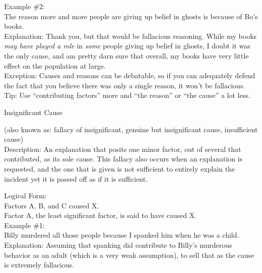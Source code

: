 \documentclass[a4paper,12pt,single,pdftex]{scrartcl}
\begin{document}
{    
      Example \#2:
    \\

    
      The reason more and more people are giving up belief in ghosts is because of Bo’s books.
    \\

    
      Explanation: Thank you, but that would be fallacious reasoning.  While my books {\it may have played a role} in {\it some} people giving up belief in ghosts, I doubt it was the only cause, and am pretty darn sure that overall, my books have very little effect on the population at large.
    \\

    
      Exception: Causes and reasons can be debatable, so if you can adequately defend the fact that you believe there was only a single reason, it won’t be fallacious.
    \\

    
      Tip: Use “contributing factors” more and “the reason” or “the cause” a lot less.
    \\

  }


Insignificant Cause
    
      (also known as: fallacy of insignificant, genuine but insignificant cause, insufficient cause)
    \\

  
    Description: An explanation that posits one minor factor, out of several that contributed, as its sole cause. This fallacy also occurs when an explanation is requested, and the one that is given is not sufficient to entirely explain the incident yet it is passed off as if it is sufficient.

    
      Logical Form:
    \\

    
      Factors A, B, and C caused X.
    \\

    
      Factor A, the least significant factor, is said to have caused X.
    \\

    
      Example \#1:
    \\

    
      Billy murdered all those people because I spanked him when he was a child.
    \\

    
      Explanation: Assuming that spanking did contribute to Billy's murderous behavior as an adult (which is a very weak assumption), to sell that as the cause is extremely fallacious.
    \\
\end{document}
